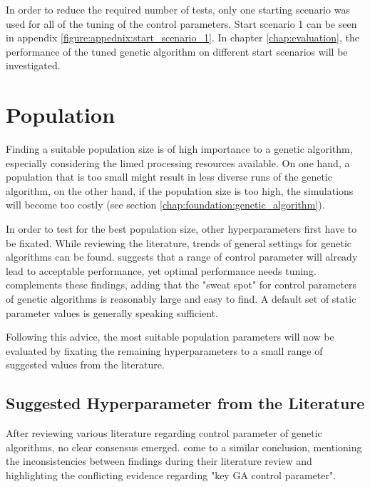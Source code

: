 In order to reduce the required number of tests, only one starting scenario was used for all of the tuning of the control parameters. Start scenario 1 can be seen in appendix \ref{figure:appednix:start_scenario_1}. In chapter \ref{chap:evaluation}, the performance of the tuned genetic algorithm on different start scenarios will be investigated.

\section{Population}
\label{chap:hyperparameter_tuning:population}
Finding a suitable population size is of high importance to a genetic algorithm, especially considering the limed processing resources available. On one hand, a population that is too small might result in less diverse runs of the genetic algorithm, on the other hand, if the population size is too high, the simulations will become too costly (see section \ref{chap:foundation:genetic_algorithm}).

In order to test for the best population size, other hyperparameters first have to be fixated. While reviewing the literature, trends of general settings for genetic algorithms can be found. 
\cite{grefenstette_optimization_1986} suggests that a range of control parameter will already lead to acceptable performance, yet optimal performance needs tuning. \cite{kacprzyk_parameter_2007} complements these findings, adding that the "sweat spot" for control parameters of genetic algorithms is reasonably large and easy to find. A default set of static parameter values is generally speaking sufficient.

Following this advice, the most suitable population parameters will now be evaluated by fixating the remaining hyperparameters to a small range of suggested values from the literature.

\subsection{Suggested Hyperparameter from the Literature}
After reviewing various literature regarding control parameter of genetic algorithms, no clear consensus emerged. \cite{mills_determining_2015} come to a similar conclusion, mentioning the inconsistencies between findings during their literature review and highlighting the conflicting evidence regarding "key GA control parameter".

